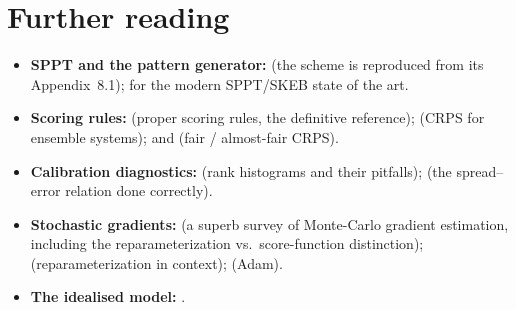 \documentclass[11pt]{article}
\begin{document}
\section*{Further reading}
\begin{itemize}
\item \textbf{SPPT and the pattern generator:} \citet{palmer2009} (the scheme is
  reproduced from its Appendix~8.1); \citet{leutbecher2017} for the modern
  SPPT/SKEB state of the art.
\item \textbf{Scoring rules:} \citet{gneiting2007} (proper scoring rules, the
  definitive reference); \citet{hersbach2000} (CRPS for ensemble systems);
  \citet{leutbecher2018} and \citet{lang2024} (fair / almost-fair CRPS).
\item \textbf{Calibration diagnostics:} \citet{hamill2001} (rank histograms and
  their pitfalls); \citet{fortin2014} (the spread--error relation done correctly).
\item \textbf{Stochastic gradients:} \citet{mohamed2020} (a superb survey of
  Monte-Carlo gradient estimation, including the reparameterization vs.\
  score-function distinction); \citet{kingma2014} (reparameterization in context);
  \citet{kingma2015adam} (Adam).
\item \textbf{The idealised model:} \citet{heldsuarez1994}.
\end{itemize}
\end{document}
